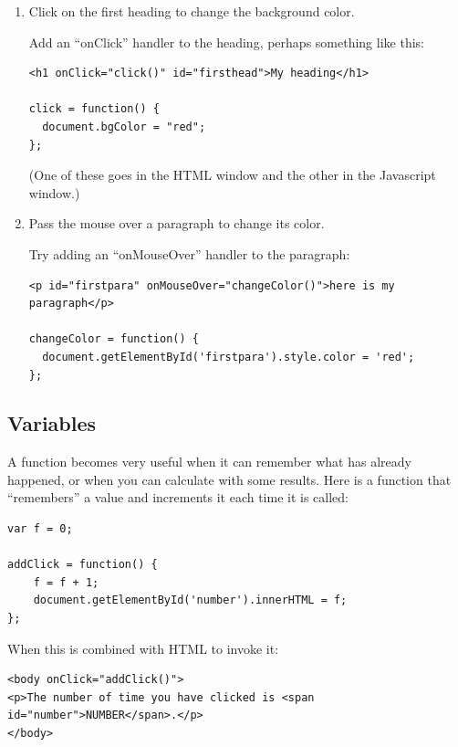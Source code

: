 \documentclass[11pt]{article}
\begin{document}
\begin{enumerate}

\item Click on the first heading to change the background color.

Add an ``onClick'' handler to the heading, perhaps something like
this:

\begin{verbatim}
<h1 onClick="click()" id="firsthead">My heading</h1>

click = function() {
  document.bgColor = "red";
};
\end{verbatim}

(One of these goes in the HTML window and the other in the Javascript
window.)

\item Pass the mouse over a paragraph to change its color.

Try adding an ``onMouseOver'' handler to the paragraph:

\begin{verbatim}
<p id="firstpara" onMouseOver="changeColor()">here is my paragraph</p>

changeColor = function() {
  document.getElementById('firstpara').style.color = 'red';
};
\end{verbatim}

\end{enumerate}


\subsection{Variables}

A function becomes very useful when it can remember what has already
happened, or when you can calculate with some results.  Here is a
function that ``remembers'' a value and increments it each time it is
called:

\begin{verbatim}
var f = 0;

addClick = function() {
    f = f + 1;
    document.getElementById('number').innerHTML = f;
};
\end{verbatim}

When this is combined with HTML to invoke it:

\begin{verbatim}
<body onClick="addClick()">
<p>The number of time you have clicked is <span id="number">NUMBER</span>.</p>
</body>
\end{verbatim}
\end{document}
